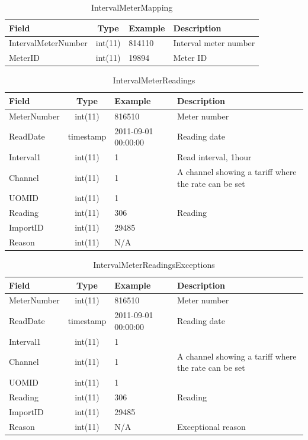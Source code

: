 \documentclass[a4paper,12pt]{llncs}
\begin{document}
\begin{table}[htp]
\centering
\caption{IntervalMeterMapping}
\begin{tabular}{|l|c|l|p{9.2cm}|}
 \hline
 {\bf Field}       & {\bf Type} & {\bf Example}     & {\bf Description } \\ \hline
IntervalMeterNumber&int(11)&814110 & Interval meter number  \\ \hline
MeterID            &int(11)&19894 &  Meter ID \\ \hline
\end{tabular}
\end{table}
\begin{table}[htp]
\centering
\caption{IntervalMeterReadings}
\begin{tabular}{|l|c|l|p{8.7cm}|}
 \hline
 {\bf Field}       & {\bf Type} & {\bf Example}     & {\bf Description } \\ \hline
MeterNumber&int(11)  &816510 & Meter number  \\ \hline
ReadDate   &timestamp&2011-09-01 00:00:00 &  Reading date \\ \hline
Interval1  &int(11)  &1 & Read interval, 1hour  \\ \hline
Channel    &int(11)  &1 & A channel showing a tariff where the rate can be set  \\ \hline
UOMID      &int(11)  &1 &   \\ \hline
Reading    &int(11)  &306 & Reading   \\ \hline
ImportID   &int(11)  &29485 &   \\ \hline
Reason     &int(11)  &N/A &   \\ \hline
\end{tabular}
\end{table}
\begin{table}[htp]
\centering
\caption{IntervalMeterReadingsExceptions}
\begin{tabular}{|l|c|l|p{8.7cm}|}
 \hline
 {\bf Field}       & {\bf Type} & {\bf Example}     & {\bf Description } \\ \hline
MeterNumber&int(11)  &816510 &  Meter number \\ \hline
ReadDate   &timestamp&2011-09-01 00:00:00 & Reading date  \\ \hline
Interval1  &int(11)  &1 &   \\ \hline
Channel    &int(11)  &1 & A channel showing a tariff where the rate can be set  \\ \hline
UOMID      &int(11)  &1 &   \\ \hline
Reading    &int(11)  &306 & Reading  \\ \hline
ImportID   &int(11)  &29485 &   \\ \hline
Reason     &int(11)  &N/A &  Exceptional reason \\ \hline
\end{tabular}
\end{table}
\end{document}
